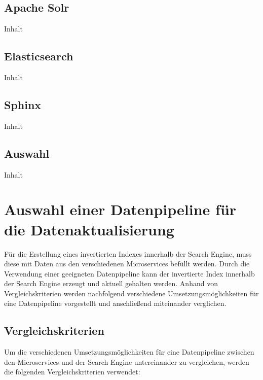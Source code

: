 \subsection{Apache Solr\label{subsec4.2.2:Unterunterpunkt-2}}

Inhalt

\subsection{Elasticsearch\label{subsec4.2.3:Unterunterpunkt-3}}

Inhalt

\subsection{Sphinx\label{subsec4.2.4:Unterunterpunkt-4}}

Inhalt

\subsection{Auswahl\label{subsec4.2.5:Unterunterpunkt-5}}

Inhalt

\section{Auswahl einer Datenpipeline für die Datenaktualisierung\label{sec4.3:Unterpunkt-3}}

Für die Erstellung eines invertierten Indexes innerhalb der Search Engine, muss diese mit Daten aus den verschiedenen Microservices befüllt werden. Durch die Verwendung einer geeigneten Datenpipeline kann der invertierte Index innerhalb der Search Engine erzeugt und aktuell gehalten werden. Anhand von Vergleichskriterien werden nachfolgend verschiedene Umsetzungsmöglichkeiten für eine Datenpipeline vorgestellt und anschließend miteinander verglichen.

\subsection{Vergleichskriterien\label{subsec4.3.1:Unterunterpunkt-1}}

Um die verschiedenen Umsetzungsmöglichkeiten für eine Datenpipeline zwischen den Microservices und der Search Engine untereinander zu vergleichen, werden die folgenden Vergleichskriterien verwendet:


